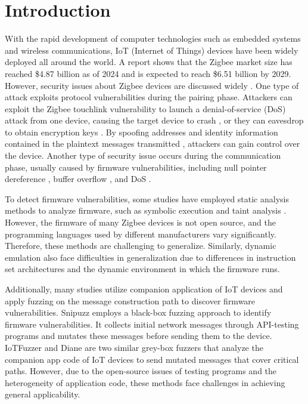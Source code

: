 \documentclass[10pt,journal,compsoc]{IEEEtran}
\begin{document}
\section{Introduction}
With the rapid development of computer technologies such as embedded systems and wireless communications, IoT  (Internet of Things) devices have been widely deployed all around the world. A report \cite{zigbeemarket} shows that the Zigbee market size has reached \$4.87 billion as of 2024 and is expected to reach \$6.51 billion by 2029. However, security issues about Zigbee devices are discussed widely \cite{db1, db2, db3}. One type of attack exploits protocol vulnerabilities during the pairing phase. Attackers can exploit the Zigbee touchlink vulnerability to launch a denial-of-service (DoS) attack from one device, causing the target device to crash \cite{morgner2017insecure}, or they can eavesdrop to obtain encryption keys \cite{dini2010considerations, zillner2015zigbee, ronen2017iot}. By spoofing addresses and identity information contained in the plaintext messages transmitted \cite{wang2022don, shafqat2022zleaks, talakala2021detecting}, attackers can gain control over the device. Another type of security issue occurs during the communication phase, usually caused by firmware vulnerabilities, including null pointer dereference \cite{chen2018iotfuzzer, feng2021snipuzz}, buffer overflow \cite{chen2018iotfuzzer, redini2021diane}, and DoS \cite{feng2021snipuzz, state1, dos2, dos3}.

To detect firmware vulnerabilities, some studies have employed static analysis methods \cite{ahmed2020identifying, chen2016towards, nadir2019auditing, sachidananda2020over} to analyze firmware, such as symbolic execution \cite{davidson2013fie, hernandez2017firmusb} and taint analysis \cite{cheng2018dtaint}. However, the firmware of many Zigbee devices is not open source, and the programming languages used by different manufacturers vary significantly. Therefore, these methods are challenging to generalize. Similarly, dynamic emulation \cite{chen2016towards, kim2020firmae, zheng2019firm, zhou2022your, ren2021z} also face difficulties in generalization due to differences in instruction set architectures and the dynamic environment in which the firmware runs. 

Additionally, many studies utilize companion application of IoT devices and apply fuzzing on the message construction path to discover firmware vulnerabilities. Snipuzz \cite{feng2021snipuzz} employs a black-box fuzzing approach to identify firmware vulnerabilities. It collects initial network messages through API-testing programs and mutates these messages before sending them to the device. IoTFuzzer \cite{chen2018iotfuzzer} and Diane \cite{redini2021diane} are two similar grey-box fuzzers that analyze the companion app code of IoT devices to send mutated messages that cover critical paths. However, due to the open-source issues of testing programs and the heterogeneity of application code, these methods face challenges in achieving general applicability.
\end{document}
